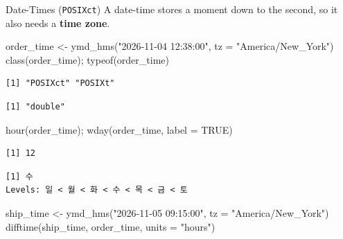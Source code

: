 \documentclass[
  ignorenonframetext,
  aspectratio=169,
]{beamer}
\newenvironment{Shaded}{\begin{snugshade}}{\end{snugshade}}
\newcommand{\AttributeTok}[1]{\textcolor[rgb]{0.40,0.45,0.13}{#1}}
\newcommand{\ConstantTok}[1]{\textcolor[rgb]{0.56,0.35,0.01}{#1}}
\newcommand{\FunctionTok}[1]{\textcolor[rgb]{0.28,0.35,0.67}{#1}}
\newcommand{\NormalTok}[1]{\textcolor[rgb]{0.00,0.23,0.31}{#1}}
\newcommand{\OtherTok}[1]{\textcolor[rgb]{0.00,0.23,0.31}{#1}}
\newcommand{\StringTok}[1]{\textcolor[rgb]{0.13,0.47,0.30}{#1}}
\begin{document}
\begin{frame}[fragile]{Date-Times (\texttt{POSIXct})}
\protect\hypertarget{date-times-posixct}{}
A date-time stores a moment down to the second, so it also needs a
\textbf{time zone}.

\begin{Shaded}
\begin{Highlighting}[]
\NormalTok{order\_time }\OtherTok{\textless{}{-}} \FunctionTok{ymd\_hms}\NormalTok{(}\StringTok{"2026{-}11{-}04 12:38:00"}\NormalTok{, }\AttributeTok{tz =} \StringTok{"America/New\_York"}\NormalTok{)}
\FunctionTok{class}\NormalTok{(order\_time); }\FunctionTok{typeof}\NormalTok{(order\_time)}
\end{Highlighting}
\end{Shaded}

\begingroup\tiny\color{darkgray}

\begin{verbatim}
[1] "POSIXct" "POSIXt" 
\end{verbatim}

\endgroup

\begingroup\tiny\color{darkgray}

\begin{verbatim}
[1] "double"
\end{verbatim}

\endgroup

\begin{Shaded}
\begin{Highlighting}[]
\FunctionTok{hour}\NormalTok{(order\_time); }\FunctionTok{wday}\NormalTok{(order\_time, }\AttributeTok{label =} \ConstantTok{TRUE}\NormalTok{)}
\end{Highlighting}
\end{Shaded}

\begingroup\tiny\color{darkgray}

\begin{verbatim}
[1] 12
\end{verbatim}

\endgroup

\begingroup\tiny\color{darkgray}

\begin{verbatim}
[1] 수
Levels: 일 < 월 < 화 < 수 < 목 < 금 < 토
\end{verbatim}

\endgroup

\begin{Shaded}
\begin{Highlighting}[]
\NormalTok{ship\_time }\OtherTok{\textless{}{-}} \FunctionTok{ymd\_hms}\NormalTok{(}\StringTok{"2026{-}11{-}05 09:15:00"}\NormalTok{, }\AttributeTok{tz =} \StringTok{"America/New\_York"}\NormalTok{)}
\FunctionTok{difftime}\NormalTok{(ship\_time, order\_time, }\AttributeTok{units =} \StringTok{"hours"}\NormalTok{)}
\end{Highlighting}
\end{Shaded}


\end{frame}
\end{document}
